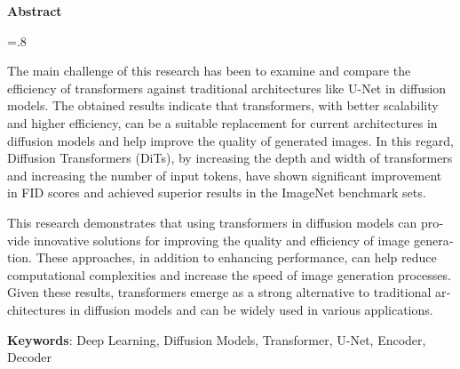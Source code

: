 


\pagestyle{empty}

\begin{latin}

\begin{center}
\textbf{Abstract}
\end{center}
\baselineskip=.8\baselineskip

The main challenge of this research has been to examine and compare the efficiency of transformers against traditional architectures like U-Net in diffusion models. The obtained results indicate that transformers, with better scalability and higher efficiency, can be a suitable replacement for current architectures in diffusion models and help improve the quality of generated images. In this regard, Diffusion Transformers (DiTs), by increasing the depth and width of transformers and increasing the number of input tokens, have shown significant improvement in FID scores and achieved superior results in the ImageNet benchmark sets.


This research demonstrates that using transformers in diffusion models can provide innovative solutions for improving the quality and efficiency of image generation. These approaches, in addition to enhancing performance, can help reduce computational complexities and increase the speed of image generation processes. Given these results, transformers emerge as a strong alternative to traditional architectures in diffusion models and can be widely used in various applications.


\bigskip\noindent\textbf{Keywords}:
Deep Learning, Diffusion Models, Transformer, U-Net, Encoder, Decoder

\end{latin}
